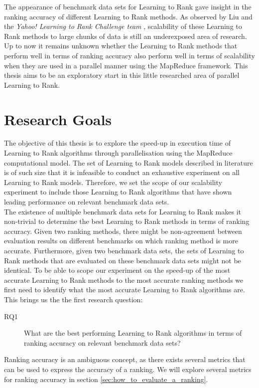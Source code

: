 The appearance of benchmark data sets for Learning to Rank gave insight in the ranking accuracy of different Learning to Rank methods. As observed by Liu \cite{Liu2007} and the \emph{Yahoo! Learning to Rank Challenge team} \cite{Chapelle2011b}, scalability of these Learning to Rank methods to large chunks of data is still an underexposed area of research. Up to now it remains unknown whether the Learning to Rank methods that perform well in terms of ranking accuracy also perform well in terms of scalability when they are used in a parallel manner using the MapReduce framework. This thesis aims to be an exploratory start in this little researched area of parallel Learning to Rank.\\

\section{Research Goals}
\label{sec:goals}
The objective of this thesis is to explore the speed-up in execution time of Learning to Rank algorithms through parallelisation using the MapReduce computational model. The set of Learning to Rank models described in literature is of such size that it is infeasible to conduct an exhaustive experiment on all Learning to Rank models. Therefore, we set the scope of our scalability experiment to include those Learning to Rank algorithms that have shown leading performance on relevant benchmark data sets.\\

The existence of multiple benchmark data sets for Learning to Rank makes it non-trivial to determine the best Learning to Rank methods in terms of ranking accuracy. Given two ranking methods, there might be non-agreement between evaluation results on different benchmarks on which ranking method is more accurate. Furthermore, given two benchmark data sets, the sets of Learning to Rank methods that are evaluated on these benchmark data sets might not be identical. To be able to scope our experiment on the speed-up of the most accurate Learning to Rank methods to the most accurate ranking methods we first need to identify what the most accurate Learning to Rank algorithms are. This brings us the the first research question: \\

\begin{description}
\item[RQ1] What are the best performing Learning to Rank algorithms in terms of ranking accuracy on relevant benchmark data sets?
\end{description}
\bigskip
Ranking accuracy is an ambiguous concept, as there exists several metrics that can be used to express the accuracy of a ranking. We will explore several metrics for ranking accuracy in section \ref{sec:how_to_evaluate_a_ranking}.\\

